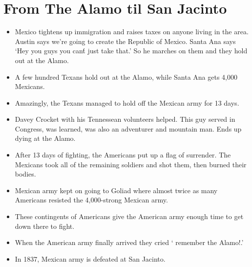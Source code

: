 \documentclass{article}
\begin{document}
\section{From The Alamo til San Jacinto}
  \begin{itemize}
    \item Mexico tightens up immigration and raises taxes on anyone living in the area. Austin says we're going to create the Republic of Mexico. Santa Ana says `Hey you guys you can\'t just take that.' So he marches on them and they hold out at the Alamo.
    \item A few hundred Texans hold out at the Alamo, while Santa Ana gets 4,000 Mexicans.
    \item Amazingly, the Texans managed to hold off the Mexican army for 13 days. 
    \item Davey Crocket with his Tennessean volunteers helped. This guy served in Congress, was learned, was also an adventurer and mountain man. Ends up dying at the Alamo.
    \item After 13 days of fighting, the Americans put up a flag of surrender. The Mexicans took all of the remaining soldiers and shot them, then burned their bodies.
    \item Mexican army kept on going to Goliad where almost twice as many Americans resisted the 4,000-strong Mexican army. 
    \item These contingents of Americans give the American army enough time to get down there to fight.
    \item When the American army finally arrived they cried ` remember the Alamo!.' 
    \item In 1837, Mexican army is defeated at San Jacinto. 
  \end{itemize}
\end{document}
